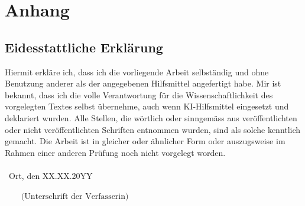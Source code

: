 \documentclass[11pt,a4paper,titlepage]{scrartcl}
\begin{document}
\newpage
\section{Anhang}
\subsection*{Eidesstattliche Erklärung}
Hiermit erkläre ich, dass ich die vorliegende Arbeit selbständig und ohne Benutzung anderer als der angegebenen Hilfsmittel angefertigt habe. Mir ist bekannt, dass ich die volle Verantwortung für die Wissenschaftlichkeit des vorgelegten Textes selbst übernehme, auch wenn KI-Hilfsmittel eingesetzt und deklariert wurden. Alle Stellen, die wörtlich oder sinngemäss aus veröffentlichten oder nicht veröffentlichten Schriften entnommen wurden, sind als solche kenntlich gemacht. Die Arbeit ist in gleicher oder ähnlicher Form oder auszugsweise im Rahmen einer anderen Prüfung noch nicht vorgelegt worden.\\\\\
\noindent Ort, den XX.XX.20YY
\begin{flushright}
$\overline{~~~~~~~~~\mbox{(Unterschrift der Verfasserin)}~~~~~~~~~}$
\end{flushright}
\end{document}
